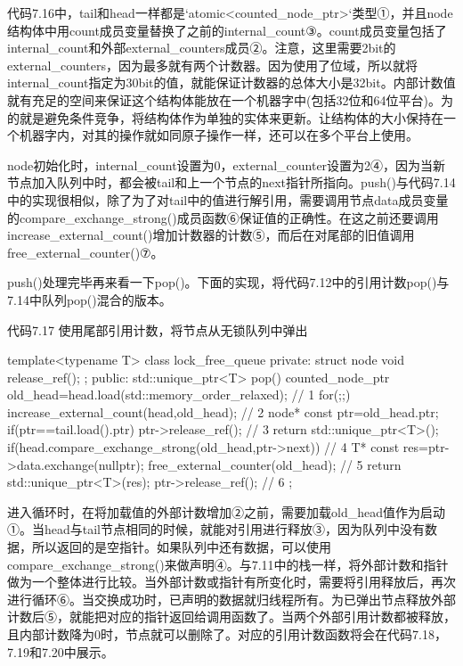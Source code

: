 代码7.16中，tail和head一样都是`atomic<counted\_node\_ptr>`类型①，并且node结构体中用count成员变量替换了之前的internal\_count③。count成员变量包括了internal\_count和外部external\_counters成员②。注意，这里需要2bit的external\_counters，因为最多就有两个计数器。因为使用了位域，所以就将internal\_count指定为30bit的值，就能保证计数器的总体大小是32bit。内部计数值就有充足的空间来保证这个结构体能放在一个机器字中(包括32位和64位平台)。为的就是避免条件竞争，将结构体作为单独的实体来更新。让结构体的大小保持在一个机器字内，对其的操作就如同原子操作一样，还可以在多个平台上使用。

node初始化时，internal\_count设置为0，external\_counter设置为2④，因为当新节点加入队列中时，都会被tail和上一个节点的next指针所指向。push()与代码7.14中的实现很相似，除了为了对tail中的值进行解引用，需要调用节点data成员变量的compare\_exchange\_strong()成员函数⑥保证值的正确性。在这之前还要调用increase\_external\_count()增加计数器的计数⑤，而后在对尾部的旧值调用free\_external\_counter()⑦。

push()处理完毕再来看一下pop()。下面的实现，将代码7.12中的引用计数pop()与7.14中队列pop()混合的版本。

代码7.17 使用尾部引用计数，将节点从无锁队列中弹出

\begin{cpp}
template<typename T>
class lock_free_queue
{
private:
  struct node
  {
    void release_ref();
  };
public:
  std::unique_ptr<T> pop()
  {
    counted_node_ptr old_head=head.load(std::memory_order_relaxed);  // 1
    for(;;)
    {
      increase_external_count(head,old_head);  // 2
      node* const ptr=old_head.ptr;
      if(ptr==tail.load().ptr)
      {
        ptr->release_ref();  // 3
        return std::unique_ptr<T>();
      }
      if(head.compare_exchange_strong(old_head,ptr->next))  // 4
      {
        T* const res=ptr->data.exchange(nullptr);
        free_external_counter(old_head);  // 5
        return std::unique_ptr<T>(res);
      }
      ptr->release_ref();  // 6
    }
  }
};
\end{cpp}

进入循环时，在将加载值的外部计数增加②之前，需要加载old\_head值作为启动①。当head与tail节点相同的时候，就能对引用进行释放③，因为队列中没有数据，所以返回的是空指针。如果队列中还有数据，可以使用compare\_exchange\_strong()来做声明④。与7.11中的栈一样，将外部计数和指针做为一个整体进行比较。当外部计数或指针有所变化时，需要将引用释放后，再次进行循环⑥。当交换成功时，已声明的数据就归线程所有。为已弹出节点释放外部计数后⑤，就能把对应的指针返回给调用函数了。当两个外部引用计数都被释放，且内部计数降为0时，节点就可以删除了。对应的引用计数函数将会在代码7.18，7.19和7.20中展示。

